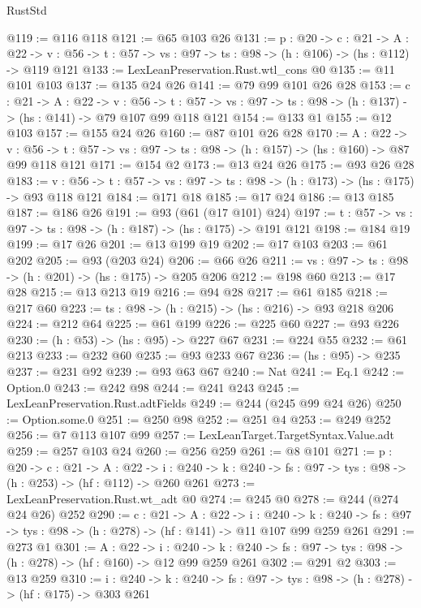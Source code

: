 \begin{lexlean}{RustStd}
\begin{coremodule}
{\begin{coremodule}
{{{{{{{{{@119 := @116 @118
@121 := @65 @103 @26
@131 := {p : @20} ->
  {c : @21} ->
  {A : @22} ->
  {v : @56} -> {t : @57} -> {vs : @97} -> {ts : @98} -> (h : @106) -> (hs : @112) -> @119 @121
@133 := LexLeanPreservation.Rust.wtl_cons @0
@135 := @11 @101 @103
@137 := @135 @24 @26
@141 := @79 @99 @101 @26 @28
@153 := {c : @21} ->
  {A : @22} ->
  {v : @56} ->
  {t : @57} -> {vs : @97} -> {ts : @98} -> (h : @137) -> (hs : @141) -> @79 @107 @99 @118 @121
@154 := @133 @1
@155 := @12 @103
@157 := @155 @24 @26
@160 := @87 @101 @26 @28
@170 := {A : @22} ->
  {v : @56} ->
  {t : @57} -> {vs : @97} -> {ts : @98} -> (h : @157) -> (hs : @160) -> @87 @99 @118 @121
@171 := @154 @2
@173 := @13 @24 @26
@175 := @93 @26 @28
@183 := {v : @56} ->
  {t : @57} -> {vs : @97} -> {ts : @98} -> (h : @173) -> (hs : @175) -> @93 @118 @121
@184 := @171 @18
@185 := @17 @24
@186 := @13 @185
@187 := @186 @26
@191 := @93 (@61 (@17 @101) @24)
@197 := {t : @57} -> {vs : @97} -> {ts : @98} -> (h : @187) -> (hs : @175) -> @191 @121
@198 := @184 @19
@199 := @17 @26
@201 := @13 @199 @19
@202 := @17 @103
@203 := @61 @202
@205 := @93 (@203 @24)
@206 := @66 @26
@211 := {vs : @97} -> {ts : @98} -> (h : @201) -> (hs : @175) -> @205 @206
@212 := @198 @60
@213 := @17 @28
@215 := @13 @213 @19
@216 := @94 @28
@217 := @61 @185
@218 := @217 @60
@223 := {ts : @98} -> (h : @215) -> (hs : @216) -> @93 @218 @206
@224 := @212 @64
@225 := @61 @199
@226 := @225 @60
@227 := @93 @226
@230 := (h : @53) -> (hs : @95) -> @227 @67
@231 := @224 @55
@232 := @61 @213
@233 := @232 @60
@235 := @93 @233 @67
@236 := (hs : @95) -> @235
@237 := @231 @92
@239 := @93 @63 @67
@240 := Nat
@241 := Eq.{1}
@242 := Option.{0}
@243 := @242 @98
@244 := @241 @243
@245 := LexLeanPreservation.Rust.adtFields
@249 := @244 (@245 @99 @24 @26)
@250 := Option.some.{0}
@251 := @250 @98
@252 := @251 @4
@253 := @249 @252
@256 := @7 @113 @107 @99
@257 := LexLeanTarget.TargetSyntax.Value.adt
@259 := @257 @103 @24
@260 := @256 @259
@261 := @8 @101
@271 := {p : @20} ->
  {c : @21} ->
  {A : @22} ->
  {i : @240} -> {k : @240} -> {fs : @97} -> {tys : @98} -> (h : @253) -> (hf : @112) -> @260 @261
@273 := LexLeanPreservation.Rust.wt_adt @0
@274 := @245 @0
@278 := @244 (@274 @24 @26) @252
@290 := {c : @21} ->
  {A : @22} ->
  {i : @240} ->
  {k : @240} -> {fs : @97} -> {tys : @98} -> (h : @278) -> (hf : @141) -> @11 @107 @99 @259 @261
@291 := @273 @1
@301 := {A : @22} ->
  {i : @240} ->
  {k : @240} -> {fs : @97} -> {tys : @98} -> (h : @278) -> (hf : @160) -> @12 @99 @259 @261
@302 := @291 @2
@303 := @13 @259
@310 := {i : @240} ->
  {k : @240} -> {fs : @97} -> {tys : @98} -> (h : @278) -> (hf : @175) -> @303 @261
}}}}}}}}}
\end{coremodule}}
\end{coremodule}
\end{lexlean}
